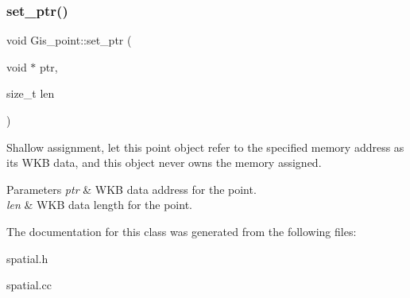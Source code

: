 \subsubsection{\texorpdfstring{set\+\_\+ptr()}{set\_ptr()}}
{\footnotesize\ttfamily void Gis\+\_\+point\+::set\+\_\+ptr (\begin{DoxyParamCaption}\item[{void $\ast$}]{ptr,  }\item[{size\+\_\+t}]{len }\end{DoxyParamCaption})}

Shallow assignment, let this point object refer to the specified memory address as its W\+KB data, and this object never owns the memory assigned. 
\begin{DoxyParams}{Parameters}
{\em ptr} & W\+KB data address for the point. \\
\hline
{\em len} & W\+KB data length for the point. \\
\hline
\end{DoxyParams}


The documentation for this class was generated from the following files\+:\begin{DoxyCompactItemize}
\item 
spatial.\+h\item 
spatial.\+cc\end{DoxyCompactItemize}
